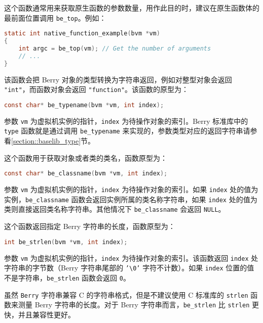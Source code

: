 这个函数通常用来获取原生函数的参数数量，用作此目的时，建议在原生函数体的最前面位置调用 \texttt{be\_top}。例如：
\begin{lstlisting}[language=c, style=berry, numbers=none]
static int native_function_example(bvm *vm)
{
    int argc = be_top(vm); // Get the number of arguments
    // ...
}
\end{lstlisting}


该函数会把 Berry 对象的类型转换为字符串返回，例如对整型对象会返回 \texttt{"int"}，而函数对象会返回 \texttt{"function"}。该函数的原型为：
\begin{lstlisting}[language=c, style=berry, numbers=none]
const char* be_typename(bvm *vm, int index);
\end{lstlisting}
参数 \texttt{vm} 为虚拟机实例的指针，\texttt{index} 为待操作对象的索引。Berry 标准库中的 \texttt{type} 函数就是通过调用 \texttt{be\_typename} 来实现的，参数类型对应的返回字符串请参看\ref{section::baselib_type}节。


这个函数用于获取对象或者类的类名，函数原型为：
\begin{lstlisting}[language=c, style=berry, numbers=none]
const char* be_classname(bvm *vm, int index);
\end{lstlisting}
参数 \texttt{vm} 为虚拟机实例的指针，\texttt{index} 为待操作对象的索引。如果 \texttt{index} 处的值为实例，\texttt{be\_classname} 函数会返回实例所属的类名称字符串，如果 \texttt{index} 处的值为类则直接返回类名称字符串。其他情况下 \texttt{be\_classname} 会返回 \texttt{NULL}。


这个函数返回指定 Berry 字符串的长度，函数原型为：
\begin{lstlisting}[language=c, style=berry, numbers=none]
int be_strlen(bvm *vm, int index);
\end{lstlisting}
参数 \texttt{vm} 为虚拟机实例的指针，\texttt{index} 为待操作对象的索引。该函数返回 \texttt{index} 处字符串的字节数（Berry 字符串尾部的 \texttt{'\textbackslash 0'} 字符不计数）。如果 \texttt{index} 位置的值不是字符串，\texttt{be\_strlen} 函数会返回 \texttt{0}。

虽然 \texttt{Berry} 字符串兼容 C 的字符串格式，但是不建议使用 C 标准库的 \texttt{strlen} 函数来测量 Berry 字符串的长度。对于 Berry 字符串而言，\texttt{be\_strlen} 比 \texttt{strlen} 更快，并且兼容性更好。


